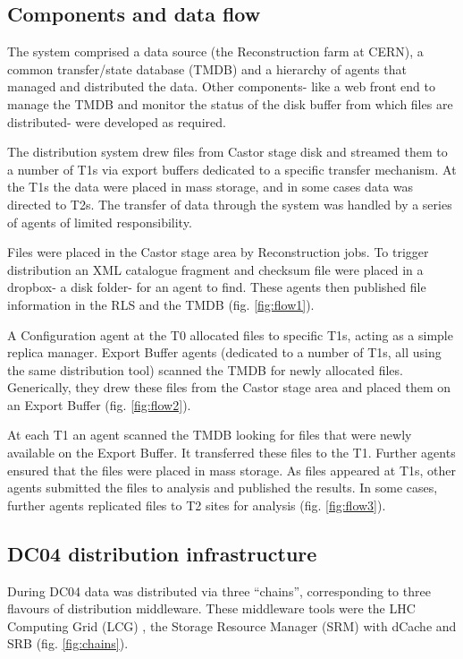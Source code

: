 \documentclass{cmspaper}
\begin{document}
\subsection{Components and data flow}
The system comprised a data source (the Reconstruction farm at CERN),
a common transfer/state database (TMDB) and a hierarchy of agents that
managed and distributed the data. Other components- like a web front
end to manage the TMDB and monitor the status of the disk buffer from
which files are distributed- were developed as required.

The distribution system drew files from Castor stage disk and streamed
them to a number of T1s via export buffers dedicated to a specific
transfer mechanism. At the T1s the data were placed in mass storage,
and in some cases data was directed to T2s. The transfer of data
through the system was handled by a series of agents of limited
responsibility.

Files were placed in the Castor stage area by Reconstruction jobs. To
trigger distribution an XML catalogue fragment and checksum file were
placed in a dropbox- a disk folder- for an agent to find. These agents
then published file information in the RLS and the TMDB
(fig. \ref{fig:flow1}).

A Configuration agent at the T0 allocated files to specific T1s,
acting as a simple replica manager. Export Buffer agents (dedicated to
a number of T1s, all using the same distribution tool) scanned the
TMDB for newly allocated files. Generically, they drew these files
from the Castor stage area and placed them on an Export Buffer
(fig. \ref{fig:flow2}).

At each T1 an agent scanned the TMDB looking for files that were newly
available on the Export Buffer. It transferred these files to the
T1. Further agents ensured that the files were placed in mass
storage. As files appeared at T1s, other agents submitted the files to
analysis and published the results. In some cases, further agents
replicated files to T2 sites for analysis (fig. \ref{fig:flow3}).

\subsection{DC04 distribution infrastructure}
During DC04 data was distributed via three ``chains'', corresponding
to three flavours of distribution middleware. These middleware tools
were the LHC Computing Grid (LCG) \cite{lcg}, the Storage Resource
Manager (SRM) \cite{srm} with dCache \cite{dcache} and SRB \cite{srb}
(fig. \ref{fig:chains}).
\end{document}
